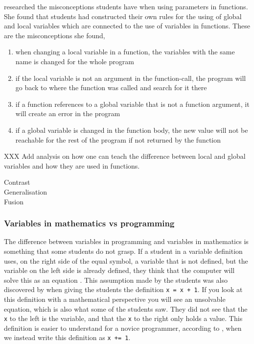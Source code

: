 \Textcite{Fleury1991} researched the 
misconceptions students have when using parameters in functions.
She found that students had constructed their own rules for the using 
of global and local variables which are connected to the use of variables in 
functions. These are the misconceptions she found, 

\begin{enumerate}
    \item when changing a local variable in a function, the variables with 
the same name is changed for the whole program

    \item if the local variable is not an argument in the function-call, 
the program will go back to where the function was called and search 
for it there

    \item if a function references to a global variable that is not a 
function argument, it will create an error in the program

    \item if a global variable is changed in the function body, the new 
value will not be reachable for the rest of the program if not returned 
by the function
\end{enumerate}

XXX Add analysis on how one can teach the difference between local and 
global variables and how they are used in functions. 

\begin{description}
    \item[Contrast]
    \item[Generalisation]
    \item[Fusion]
\end{description}

\subsubsection{Variables in mathematics vs programming}

The difference between variables in programming and variables in 
mathematics is something that some students do not grasp. If a student in a 
variable 
definition uses, on the right side of the equal symbol, a variable that is 
not 
defined, but the variable on the left side is already defined, they think 
that 
the computer will solve this as an equation \parencite{Plass2015Variables}. 
This assumption made by the students was also discovered by 
\textcite{Kohn2017VariableEvaluation} when giving the students the 
definition 
\texttt{x = x + 1}. If you look at this definition with a 
mathematical 
perspective you will see an unsolvable equation, which is also what some of 
the 
students saw. They did not see that the \texttt{x} to the left 
is the 
variable, 
and that the \texttt{x} to the right only holds a value. This 
definition is  
easier to understand for a novice programmer, according to 
\textcite{Kohn2017VariableEvaluation}, when we instead write this 
definition as 
\texttt{x += 1}. 

